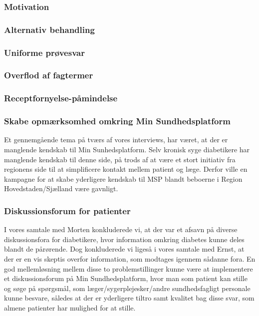 \subsubsection{Motivation}
\subsubsection{Alternativ behandling}
\subsubsection{Uniforme prøvesvar}
\subsubsection{Overflod af fagtermer}
\subsubsection{Receptfornyelse-påmindelse}
\subsubsection{Skabe opmærksomhed omkring Min Sundhedsplatform}
Et gennemgående tema på tværs af vores interviews, har været, at der er manglende kendskab til Min Sunhedsplatform. Selv kronisk syge diabetikere har manglende kendskab til denne side, på trods af at være et stort initiativ fra regionens side til at simplificere kontakt mellem patient og læge. Derfor ville en kampagne for at skabe yderligere kendskab til MSP blandt beboerne i Region Hovedstaden/Sjælland være gavnligt.
\subsubsection{Diskussionsforum for patienter}
I vores samtale med Morten konkluderede vi, at der var et afsavn på diverse diskussionsfora for diabetikere, hvor information omkring diabetes kunne deles blandt de pårørende.
Dog konkluderede vi ligeså i vores samtale med Ernst, at der er en vis skeptis overfor information, som modtages igennem sådanne fora. En god mellemløsning mellem disse to problemstillinger kunne være at implementere et diskussionsforum på Min Sundhedsplatform, hvor man som patient kan stille og søge på spørgsmål, som læger/sygerplejesker/andre sundhedsfagligt personale kunne besvare, således at der er yderligere tiltro samt kvalitet bag disse svar, som almene patienter har mulighed for at stille. 
